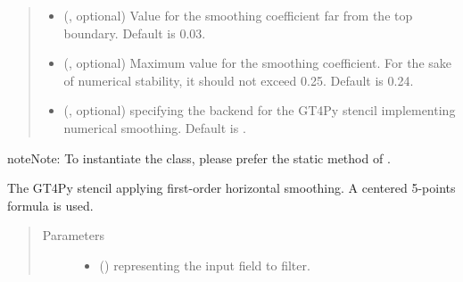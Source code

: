 \documentclass[letterpaper,10pt,english]{sphinxmanual}
\begin{document}
\begin{fulllineitems}
\begin{fulllineitems}
\begin{quote}
\begin{description}
\begin{itemize}
\item {} 
 (, optional) \textendash{} Value for the smoothing coefficient far from the top boundary. Default is 0.03.

\item {} 
 (, optional) \textendash{} Maximum value for the smoothing coefficient. For the sake of numerical stability, it should not
exceed 0.25. Default is 0.24.

\item {} 
 (, optional) \textendash{}  specifying the backend for the GT4Py stencil implementing numerical
smoothing. Default is .

\end{itemize}

\end{description}\end{quote}

\begin{sphinxadmonition}{note}{Note:}
To instantiate the class, please prefer the static method
{\hyperref[\detokenize{api:tasmania.dycore.horizontal_smoothing.HorizontalSmoothing.factory}]{}}
of {\hyperref[\detokenize{api:tasmania.dycore.horizontal_smoothing.HorizontalSmoothing}]{}}.
\end{sphinxadmonition}

\end{fulllineitems}


\begin{fulllineitems}
\label{\detokenize{api:tasmania.dycore.horizontal_smoothing.HorizontalSmoothingFirstOrderXYZ._stencil_defs}}
The GT4Py stencil applying first-order horizontal smoothing. A centered 5-points formula is used.
\begin{quote}\begin{description}
\item[{Parameters}] \leavevmode\begin{itemize}
\item {} 
 () \textendash{}  representing the input field to filter.


\end{itemize}
\end{description}
\end{quote}
\end{fulllineitems}
\end{fulllineitems}
\end{document}
